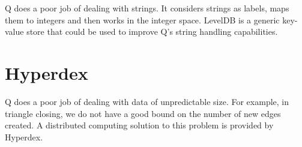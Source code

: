 Q does a poor job of dealing with strings. It considers strings as
labels, maps them to integers and then works in the integer space.
LevelDB is a generic key-value store that could be used to improve Q's
string handling capabilities.

\section{Hyperdex}
\label{Hyperdex}

Q does a poor job of dealing with data of unpredictable size. For
example, in triangle closing, we do not have a good bound on the number
of new edges created. A distributed computing solution to this problem
is provided by Hyperdex.
